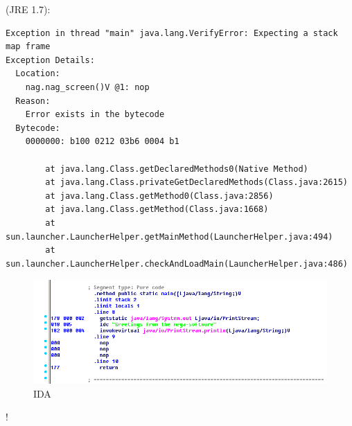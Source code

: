  (JRE 1.7):

\begin{lstlisting}
Exception in thread "main" java.lang.VerifyError: Expecting a stack map frame
Exception Details:
  Location:
    nag.nag_screen()V @1: nop
  Reason:
    Error exists in the bytecode
  Bytecode:
    0000000: b100 0212 03b6 0004 b1

        at java.lang.Class.getDeclaredMethods0(Native Method)
        at java.lang.Class.privateGetDeclaredMethods(Class.java:2615)
        at java.lang.Class.getMethod0(Class.java:2856)
        at java.lang.Class.getMethod(Class.java:1668)
        at sun.launcher.LauncherHelper.getMainMethod(LauncherHelper.java:494)
        at sun.launcher.LauncherHelper.checkAndLoadMain(LauncherHelper.java:486)
\end{lstlisting}



\begin{figure}[H]
\centering
\includegraphics[scale=\FigScale]{Java_and_NET/java/13_patching/1/3.png}
\caption{IDA}
\end{figure}


!
